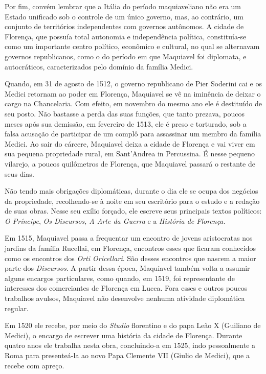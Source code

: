 Por fim, convém lembrar que a Itália do período maquiaveliano não era um
Estado unificado sob o controle de um único governo, mas, ao contrário,
um conjunto de territórios independentes com governos autônomos. A
cidade de Florença, que possuía total autonomia e independência
política, constituía-se como um importante centro político, econômico e
cultural, no qual se alternavam governos republicanos, como o do período
em que Maquiavel foi diplomata, e autocráticos, caracterizados pelo
domínio da família Medici.

Quando, em 31 de agosto de 1512, o governo republicano de Pier Soderini
cai e os Medici retornam ao poder em Florença, Maquiavel se vê na
iminência de deixar o cargo na Chancelaria. Com efeito, em novembro do
mesmo ano ele é destituído de seu posto. Não bastasse a perda das suas
funções, que tanto prezava, poucos meses após sua demissão, em fevereiro
de 1513, ele é preso e torturado, sob a falsa acusação de participar de
um complô para assassinar um membro da família Medici. Ao sair do
cárcere, Maquiavel deixa a cidade de Florença e vai viver em sua pequena
propriedade rural, em Sant'Andrea in Percussina. É nesse pequeno
vilarejo, a poucos quilômetros de Florença, que Maquiavel passará o
restante de seus dias.

Não tendo mais obrigações diplomáticas, durante o dia ele se ocupa dos
negócios da propriedade, recolhendo-se à noite em seu escritório para o
estudo e a redação de suas obras. Nesse seu exílio forçado, ele escreve
seus principais textos políticos: \emph{O Príncipe}, \emph{Os Discursos,
A Arte da Guerra} e a \emph{História de Florença.}

Em 1515, Maquiavel passa a frequentar um encontro de jovens aristocratas
nos jardins da família Rucellai, em Florença, encontros esses que
ficaram conhecidos como os encontros dos \emph{Orti Oricellari}. São
desses encontros que nascem a maior parte dos \emph{Discursos}. A partir
dessa época, Maquiavel também volta a assumir alguns encargos
particulares, como quando, em 1519, foi representante de interesses dos
comerciantes de Florença em Lucca. Fora esses e outros poucos trabalhos
avulsos, Maquiavel não desenvolve nenhuma atividade diplomática regular.

Em 1520 ele recebe, por meio do \emph{Studio} florentino e do papa Leão
X (Guiliano de Medici), o encargo de escrever uma história da cidade de
Florença. Durante quatro anos ele trabalha nesta obra, concluindo-a em
1525, indo pessoalmente a Roma para presenteá-la ao novo Papa Clemente
VII (Giulio de Medici), que a recebe com apreço.

